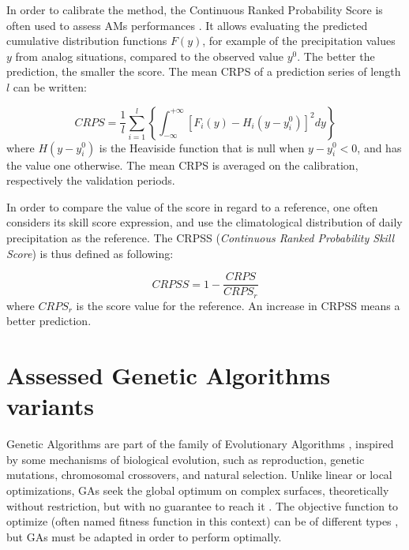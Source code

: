 \documentclass{ametsoc}
\begin{document}
In order to calibrate the method, the Continuous Ranked Probability Score \citep[CRPS,][]{Brown1974, Matheson1976, Hersbach2000} is often used to assess AMs performances \citep[see, e.g.,][]{Bontron2004, Bontron2005, BenDaoud2008, Horton2012, Marty2012, Radanovics2013, Chardon2014, Junk2015, BenDaoud2016, Caillouet2016}. It allows evaluating the predicted cumulative distribution functions $F(y)$, for example of the precipitation values $y$ from analog situations, compared to the observed value $y^{0}$. The better the prediction, the smaller the score. The mean CRPS of a prediction series of length $l$ can be written:

\begin{equation}
\label{eq:CRPS}
CRPS = \frac{1}{l} \sum_{i=1}^{l} \left\{  \int_{-\infty}^{+\infty} \left[ F_{i}(y)-H_{i}(y-y_{i}^{0})\right]^{2} dy \right\} 
\end{equation}
where $H(y-y_{i}^{0})$ is the Heaviside function that is null when $y-y_{i}^{0}<0$, and has the value one otherwise. The mean CRPS is averaged on the calibration, respectively the validation periods.

In order to compare the value of the score in regard to a reference, one often considers its skill score expression, and use the climatological distribution of daily precipitation as the reference. The CRPSS (\textit{Continuous Ranked Probability Skill Score}) is thus defined as following:

\begin{equation}
\label{eq:CRPSS}
CRPSS = 1-\frac{CRPS}{CRPS_{r}}
\end{equation}
where $CRPS_{r}$ is the score value for the reference. An increase in CRPSS means a better prediction.


\section{Assessed Genetic Algorithms variants}
\label{sec:gas}

Genetic Algorithms \citep[GAs,][]{Holland1992b, Goldberg1989} are part of the family of Evolutionary Algorithms \citep{Back1993b, Schwefel1993}, inspired by some mechanisms of biological evolution, such as reproduction, genetic mutations, chromosomal crossovers, and natural selection. Unlike linear or local optimizations, GAs seek the global optimum on complex surfaces, theoretically without restriction, but with no guarantee to reach it \citep{Haupt2004}. The objective function to optimize (often named fitness function in this context) can be of different types \citep{Joines1996a}, but GAs must be adapted in order to perform optimally.
\end{document}
